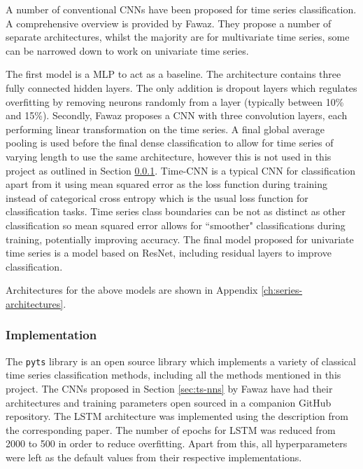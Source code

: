 A number of conventional CNNs have been proposed for time series classification. A comprehensive overview is provided by Fawaz\cite{fawaz2020deep}. They propose a number of separate architectures, whilst the majority are for multivariate time series, some can be narrowed down to work on univariate time series. 

The first model is a MLP to act as a baseline. The architecture contains three fully connected hidden layers. The only addition is dropout layers which regulates overfitting by removing neurons randomly from a layer (typically between 10\% and 15\%). Secondly, Fawaz proposes a CNN with three convolution layers, each performing linear transformation on the time series. A final global average pooling is used before the final dense classification to allow for time series of varying length to use the same architecture, however this is not used in this project as outlined in Section \ref{sec:ts-implementation}. Time-CNN is a typical CNN for classification apart from it using mean squared error as the loss function during training instead of categorical cross entropy which is the usual loss function for classification tasks. Time series class boundaries can be not as distinct as other classification so mean squared error allows for ``smoother" classifications during training, potentially improving accuracy. The final model proposed for univariate time series is a model based on ResNet, including residual layers to improve classification.

Architectures for the above models are shown in Appendix \ref{ch:series-architectures}.

\subsubsection{Implementation}
\label{sec:ts-implementation}

The \verb|pyts| library\cite{faouzi2020pyts} is an open source library which implements a variety of classical time series classification methods, including all the methods mentioned in this project. The CNNs proposed in Section \ref{sec:ts-nns} by Fawaz have had their architectures and training parameters open sourced in a companion GitHub repository\cite{fawaz2019deep}. The LSTM architecture was implemented using the description from the corresponding paper. The number of epochs for LSTM was reduced from 2000 to 500 in order to reduce overfitting. Apart from this, all hyperparameters were left as the default values from their respective implementations.

